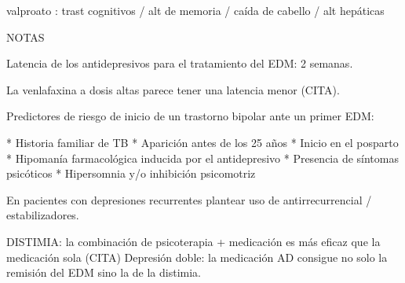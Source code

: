 valproato : trast cognitivos / alt de memoria / caída de cabello / alt hepáticas

NOTAS

Latencia de los antidepresivos para el tratamiento del EDM: 2 semanas.

La venlafaxina a dosis altas parece tener una latencia menor (CITA).

Predictores de riesgo de inicio de un trastorno bipolar ante un primer EDM:

* Historia familiar de TB
* Aparición antes de los 25 años
* Inicio en el posparto
* Hipomanía farmacológica inducida por el antidepresivo
* Presencia de síntomas psicóticos
* Hipersomnia y/o inhibición psicomotriz

En pacientes con depresiones recurrentes plantear uso de antirrecurrencial / estabilizadores.

DISTIMIA: la combinación de psicoterapia + medicación es más eficaz que la medicación sola (CITA)
Depresión doble: la medicación AD consigue no solo la remisión del EDM sino la de la distimia.
